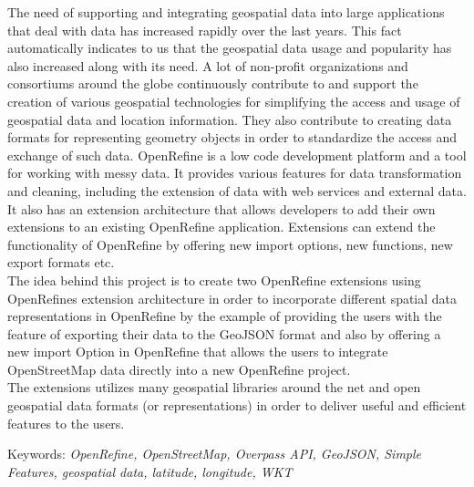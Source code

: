 The need of supporting and integrating geospatial data into large applications that deal with data has increased rapidly over the last years. This fact automatically indicates to us that the geospatial data usage and popularity has also increased along with its need.
A lot of non-profit organizations and consortiums around the globe continuously contribute to and support the creation of various geospatial technologies for simplifying the access and usage of geospatial data and location information. They also contribute to creating data formats for representing geometry objects in order to standardize the access and exchange of such data.
\newline
OpenRefine is a low code development platform and a tool for working with messy data.
It provides various features for
data transformation and cleaning, including the extension of data with web services and external data.
It also has an extension architecture that allows developers to add their own extensions to an existing OpenRefine application.
Extensions can extend the functionality of OpenRefine by offering new import options, new functions, new export formats etc.\\
\newline
The idea behind this project is to create two OpenRefine extensions using OpenRefine\textquotesingle s extension architecture in order to incorporate
different spatial data representations in OpenRefine by the example of providing the users with the feature of exporting their data to the GeoJSON format
and also by offering a new import Option in OpenRefine that allows the users to integrate OpenStreetMap data directly into a new OpenRefine project.\\
\newline
The extensions utilizes many geospatial libraries around the net and open geospatial data formats (or representations) in order to deliver useful and efficient features to the users.\\
\newline

Keywords: \textit{OpenRefine, OpenStreetMap, Overpass API, GeoJSON, Simple Features, geospatial data, latitude, longitude, WKT}